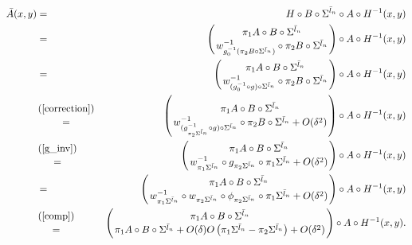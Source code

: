 \begin{eqnarray}
\nonumber  \bar A(x,y)&=&H \circ B \circ \Sigma^{\bar l_n} \circ A \circ H^{-1}(x,y) \\
\nonumber &=&\left( { \pi_1 A \circ B \circ \Sigma^{\bar l_n}  \atop    w_{g_0^{-1}( \pi_2 B \circ \Sigma^{\bar l_n}  )}^{-1}  \circ \pi_2 B \circ \Sigma^{\bar l_n} } \right) \circ A \circ H^{-1}(x,y) \\
\nonumber &=&\left( { \pi_1 A \circ B \circ \Sigma^{\bar l_n}  \atop    w_{(g_0^{-1} \circ g) \circ \Sigma^{\bar l_n}  }^{-1}  \circ \pi_2 B \circ \Sigma^{\bar l_n} } \right) \circ A \circ H^{-1}(x,y) \\
\nonumber &{(\ref{correction}) \atop =}&\left( { \pi_1 A \circ B \circ \Sigma^{\bar l_n}  \atop    w_{ {(g_{ \pi_2 \Sigma^{\bar l_n}  }^{-1} \circ g) \circ \Sigma^{\bar l_n}  }  }^{-1}  \circ \pi_2 B \circ \Sigma^{\bar l_n} +O(\delta^2)} \right) \circ A \circ H^{-1}(x,y) \\
\nonumber & {(\ref{g_inv}) \atop =}& \left( { \pi_1 A \circ B \circ \Sigma^{\bar l_n}  \atop   w_{\pi_1 \Sigma^{\bar l_n} }^{-1}   \circ g_{\pi_2 \Sigma^{\bar l_n} } \circ \pi_1 \Sigma^{\bar l_n} +O(\delta^2)} \right) \circ A \circ H^{-1}(x,y) \\
\nonumber  &=&\left( { \pi_1 A \circ B \circ \Sigma^{\bar l_n}   \atop     w_{\pi_1 \Sigma^{\bar l_n} }^{-1}  \circ w_{\pi_2 \Sigma^{\bar l_n} }\circ \phi_{\pi_2 \Sigma^{\bar l_n}} \circ \pi_1 \Sigma^{\bar l_n} +O(\delta^2)} \right) \circ A \circ H^{-1}(x,y) \\
\nonumber  &{(\ref{comp}) \atop =}&\left( { \pi_1 A \circ B \circ \Sigma^{\bar l_n}   \atop  \pi_1 A \circ B \circ \Sigma^{\bar l_n} +O(\delta) O\left({\pi_1 \Sigma^{\bar l_n}} -{\pi_2 \Sigma^{\bar l_n} }\right)+O(\delta^2)} \right) \circ A \circ H^{-1}(x,y).
\end{eqnarray}


